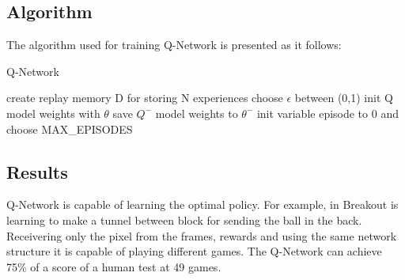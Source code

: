 \subsection{Algorithm}
The algorithm\cite{nature} used for training Q-Network is presented as it follows:
\begin{algorithm}
	\caption{Q-Network} \label{sgd-code}
	\begin{algorithmic}[1]
		\State create replay memory D for storing N experiences
		\State choose $\epsilon$ between (0,1)
		\State init Q model weights with $\theta$
		\State save $Q^-$ model weights to $\theta^-$
		\State init variable episode to 0 and choose MAX_EPISODES
		\EndWhile

		
	\end{algorithmic}
\end{algorithm}

\newpage


\subsection{Results}

Q-Network is capable of learning the optimal policy. For example, in Breakout is learning to make a tunnel between block for sending the ball in the back. Receivering only the pixel from the frames, rewards and using the same network structure it is capable of playing different games. The Q-Network can achieve 75\% of a score of a human test at 49 games\cite{nature}.


